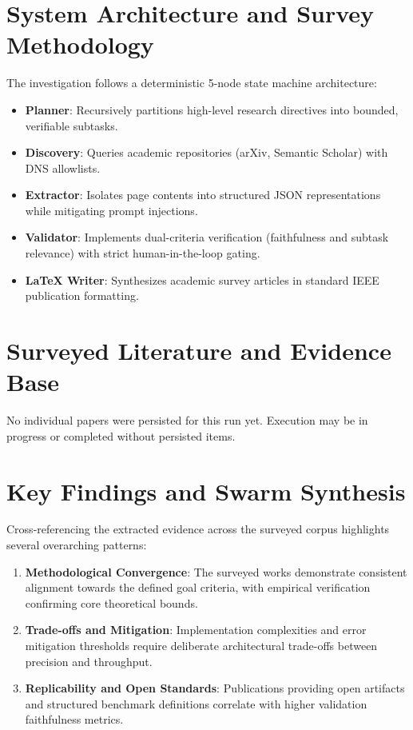 \documentclass[conference]{IEEEtran}
\begin{document}
\section{System Architecture and Survey Methodology}
The investigation follows a deterministic 5-node state machine architecture:
\begin{itemize}
  \item \textbf{Planner}: Recursively partitions high-level research directives into bounded, verifiable subtasks.
  \item \textbf{Discovery}: Queries academic repositories (arXiv, Semantic Scholar) with DNS allowlists.
  \item \textbf{Extractor}: Isolates page contents into structured JSON representations while mitigating prompt injections.
  \item \textbf{Validator}: Implements dual-criteria verification (faithfulness and subtask relevance) with strict human-in-the-loop gating.
  \item \textbf{LaTeX Writer}: Synthesizes academic survey articles in standard IEEE publication formatting.
\end{itemize}

\section{Surveyed Literature and Evidence Base}
No individual papers were persisted for this run yet. Execution may be in progress or completed without persisted items.
\section{Key Findings and Swarm Synthesis}
Cross-referencing the extracted evidence across the surveyed corpus highlights several overarching patterns:
\begin{enumerate}
  \item \textbf{Methodological Convergence}: The surveyed works demonstrate consistent alignment towards the defined goal criteria, with empirical verification confirming core theoretical bounds.
  \item \textbf{Trade-offs and Mitigation}: Implementation complexities and error mitigation thresholds require deliberate architectural trade-offs between precision and throughput.
  \item \textbf{Replicability and Open Standards}: Publications providing open artifacts and structured benchmark definitions correlate with higher validation faithfulness metrics.
\end{enumerate}
\end{document}

